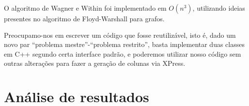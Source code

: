 \documentclass[letterpaper,11pt]{article}
\begin{document}


O algoritmo de Wagner e Within foi implementado em $O(n^3)$, utilizando
ideias presentes no algoritmo de Floyd-Warshall para grafos.  

Preocupamo-nos em escrever um código que fosse reutilizável, isto é,
dado um novo par ``problema mestre''-``problema restrito'', basta
implementar duas classes em C++ segundo certa interface padrão, e
poderemos utilizar nosso código sem outras alterações para fazer a
geração de colunas via XPress.

\section{Análise de resultados}



\end{document}
